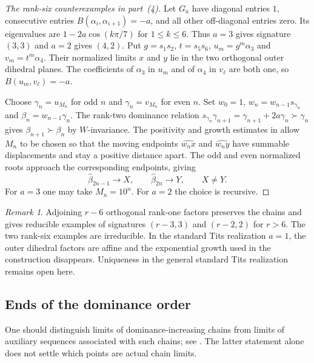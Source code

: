 \documentclass[11pt,reqno]{amsart}
\theoremstyle{plain}
\theoremstyle{definition}
\theoremstyle{remark}
\newtheorem{remark}[theorem]{Remark}
\numberwithin{equation}{section}
\begin{document}
\begin{proof}[The rank-six counterexamples in part~(4)]
Let $G_a$ have diagonal entries $1$, consecutive entries
$B(\alpha_i,\alpha_{i+1})=-a$, and all other off-diagonal entries zero.
Its eigenvalues are $1-2a\cos(k\pi/7)$ for $1\le k\le6$.
Thus $a=3$ gives signature $(3,3)$ and $a=2$ gives $(4,2)$.
Put $g=s_1s_2$, $t=s_5s_6$, $u_m=g^m\alpha_3$ and $v_m=t^m\alpha_4$.
Their normalized limits $x$ and $y$ lie in the two orthogonal outer
dihedral planes. The coefficients of $\alpha_3$ in $u_m$ and of
$\alpha_4$ in $v_\ell$ are both one, so $B(u_m,v_\ell)=-a$.

Choose $\gamma_n=u_{M_n}$ for odd $n$ and $\gamma_n=v_{M_n}$ for
even $n$. Set $w_0=1$, $w_n=w_{n-1}s_{\gamma_n}$ and
$\beta_n=w_{n-1}\gamma_n$. The rank-two dominance relation
$s_{\gamma_n}\gamma_{n+1}=\gamma_{n+1}+2a\gamma_n\succ\gamma_n$
gives $\beta_{n+1}\succ\beta_n$ by $W$-invariance. The positivity
and growth estimates in \cite[Proposition~4.10 and Remark~4.11]{WangUniqueness}
allow $M_n$ to be chosen so that the moving endpoints
$\widehat{w_nx}$ and $\widehat{w_ny}$ have summable displacements
and stay a positive distance apart. The odd and even normalized
roots approach the corresponding endpoints, giving
\[
 \widehat{\beta}_{2n-1}\longrightarrow X,\qquad
 \widehat{\beta}_{2n}\longrightarrow Y,\qquad X\ne Y .
\]
For $a=3$ one may take $M_n=10^n$. For $a=2$ the choice is recursive.
\end{proof}

\begin{remark}
Adjoining $r-6$ orthogonal rank-one factors preserves the chains
and gives reducible examples of signatures $(r-3,3)$ and $(r-2,2)$
for $r>6$. The two rank-six examples are irreducible. In the standard
Tits realization $a=1$, the outer dihedral factors are affine and the
exponential growth used in the construction disappears. Uniqueness
in the general standard Tits realization remains open here.
\end{remark}

\subsection{Ends of the dominance order}

One should distinguish limits of dominance-increasing chains from
limits of auxiliary sequences associated with such chains; see
\cite[Proposition~6.8(a) and Section~7.7]{DHR}. The latter statement
alone does not settle which points are actual chain limits.
\end{document}
